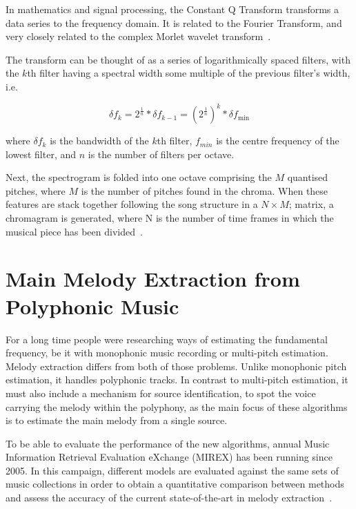 In mathematics and signal processing, the Constant Q Transform transforms a data series to the frequency domain. It is related to the Fourier Transform, and very closely related to the complex Morlet wavelet transform~\cite{wavelet}. 

The transform can be thought of as a series of logarithmically spaced filters, with the $k$th filter having a spectral width some multiple of the previous filter's width, i.e.

\begin{equation}
\delta f_k = 2^{ \frac {1}{n} } * \delta f_{k-1} = \left ( {2^{ \frac {1}{n} }} \right )^{k} * \delta f_{\mathrm{min}}
\end{equation}

where $\delta f_{k}$ is the bandwidth of the $k$th filter, $f_{min}$ is the centre frequency of the lowest filter, and $n$ is the number of filters per octave.

Next, the spectrogram is folded into one octave comprising the $M$ quantised pitches, where $M$ is the number of pitches found in the chroma. When these features are stack together following the song structure in a $N \times M$; matrix, a chromagram is generated, where N is the number of time frames in which the musical piece has been divided~\cite{constantQ}.

\vspace{20pt}
\newpage

\section{Main Melody Extraction from Polyphonic Music}
\vspace{10pt}
\label{sec:mainmelodybackground}

For a long time people were researching ways of estimating the fundamental frequency, be it with monophonic music recording or multi-pitch estimation. Melody extraction differs from both of those problems. Unlike monophonic pitch estimation, it handles polyphonic tracks. In contrast to multi-pitch estimation, it must also include a mechanism for source identification, to spot the voice carrying the melody within the polyphony, as the main focus of these algorithms is to estimate the main melody from a single source. 

To be able to evaluate the performance of the new algorithms, annual Music Information Retrieval Evaluation eXchange (MIREX) has been running since 2005. In this campaign, different models are evaluated against the same sets of music collections in order to obtain a quantitative comparison between methods and assess the accuracy of the current state-of-the-art in melody extraction~\cite{comparison}.

